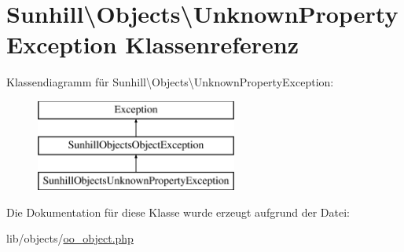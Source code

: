 \hypertarget{classSunhill_1_1Objects_1_1UnknownPropertyException}{}\section{Sunhill\textbackslash{}Objects\textbackslash{}Unknown\+Property\+Exception Klassenreferenz}
\label{classSunhill_1_1Objects_1_1UnknownPropertyException}
Klassendiagramm für Sunhill\textbackslash{}Objects\textbackslash{}Unknown\+Property\+Exception\+:\begin{figure}[H]
\begin{center}
\leavevmode
\includegraphics[height=3.000000cm]{d6/d6c/classSunhill_1_1Objects_1_1UnknownPropertyException}
\end{center}
\end{figure}


Die Dokumentation für diese Klasse wurde erzeugt aufgrund der Datei\+:\begin{DoxyCompactItemize}
\item 
lib/objects/\hyperlink{oo__object_8php}{oo\+\_\+object.\+php}\end{DoxyCompactItemize}

